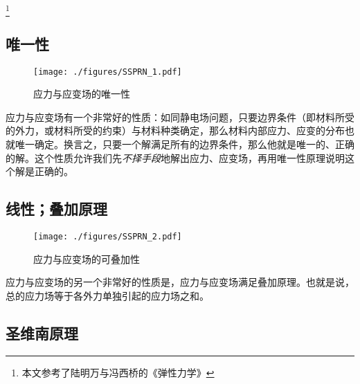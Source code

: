 \footnote{本文参考了陆明万与冯西桥的《弹性力学》}
\begin{issues}
\issueDraft
\end{issues}


\subsection{唯一性}
\begin{figure}[ht]
\centering
\texttt{[image: ./figures/SSPRN\_1.pdf]}
\caption{应力与应变场的唯一性} \label{SSPRN_fig1}
\end{figure}
应力与应变场有一个非常好的性质：如同静电场问题，只要边界条件（即材料所受的外力，或材料所受的约束）与材料种类确定，那么材料内部应力、应变的分布也就唯一确定。换言之，只要一个解满足所有的边界条件，那么他就是唯一的、正确的解。这个性质允许我们先\textsl{不择手段}地解出应力、应变场，再用唯一性原理说明这个解是正确的。

\subsection{线性；叠加原理}
\begin{figure}[ht]
\centering
\texttt{[image: ./figures/SSPRN\_2.pdf]}
\caption{应力与应变场的可叠加性} \label{SSPRN_fig2}
\end{figure}
应力与应变场的另一个非常好的性质是，应力与应变场满足叠加原理。也就是说，总的应力场等于各外力单独引起的应力场之和。%

\subsection{圣维南原理}
